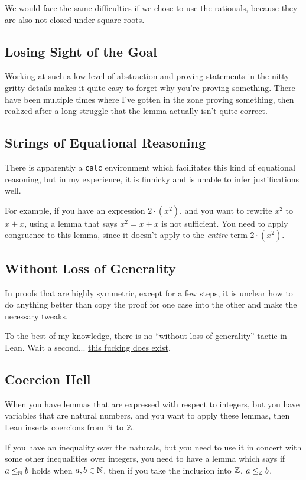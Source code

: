 \documentclass{article}
\begin{document}
We would face the same difficulties if we chose to use the rationals, because they are also not closed under square roots.

\subsection{Losing Sight of the Goal}
Working at such a low level of abstraction and proving statements in the nitty gritty details makes it quite easy to forget why you're proving something.
There have been multiple times where I've gotten in the zone proving something, then realized after a long struggle that the lemma actually isn't quite correct.

\subsection{Strings of Equational Reasoning}
There is apparently a \texttt{calc} environment which facilitates this kind of equational reasoning, but in my experience, it is finnicky and is unable to infer justifications well.

For example, if you have an expression $2 \cdot (x^2)$, and you want to rewrite $x^2$ to $x + x$, using a lemma that says $x^2 = x + x$ is not sufficient.
You need to apply congruence to this lemma, since it doesn't apply to the \textit{entire} term $2 \cdot (x^2)$.

\subsection{Without Loss of Generality}
In proofs that are highly symmetric, except for a few steps, it is unclear how to do anything better than copy the proof for one case into the other and make the necessary tweaks.

To the best of my knowledge, there is no ``without loss of generality'' tactic in Lean.
Wait a second... \href{https://leanprover-community.github.io/mathlib_docs/tactic/wlog.html}{this fucking does exist}.

\subsection{Coercion Hell}
When you have lemmas that are expressed with respect to integers, but you have variables that are natural numbers, and you want to apply these lemmas, then Lean inserts coercions from $\mathbb{N}$ to $\mathbb{Z}$.

If you have an inequality over the naturals, but you need to use it in concert with some other inequalities over integers, you need to have a lemma which says if $a \leq_{\mathbb{N}} b$ holds when $a,b \in \mathbb{N}$, then if you take the inclusion into $\mathbb{Z}$, $a \leq_{\mathbb{Z}} b$.
\end{document}
